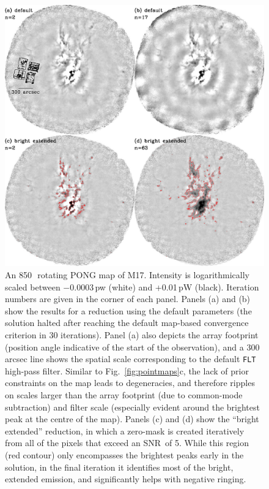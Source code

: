 \documentclass[useAMS,usenatbib,nofootinbib]{mn2e}
\newcommand{\snr}{SNR}
\newcommand{\model}[1]{\texttt{#1}}
\begin{document}
\begin{figure}
\centering
\includegraphics[width=\linewidth]{m17.pdf}
\caption{An 850\,\micron\ rotating PONG map of M17. Intensity is
logarithmically scaled between $-$0.0003\,pw (white) and +0.01\,pW
(black). Iteration numbers are given in the corner of each
panel. Panels (a) and (b) show the results for a reduction using the
default parameters (the solution halted after reaching the default
map-based convergence criterion in 30 iterations). Panel (a) also
depicts the array footprint (position angle indicative of the start of
the observation), and a 300\,arcsec line shows the spatial scale
corresponding to the default \model{FLT} high-pass filter. Similar to
Fig.~\ref{fig:pointmaps}c, the lack of prior constraints on the map
leads to degeneracies, and therefore ripples on scales larger than the
array footprint (due to common-mode subtraction) and filter scale
(especially evident around the brightest peak at the centre of the
map). Panels (c) and (d) show the ``bright extended'' reduction, in
which a zero-mask is created iteratively from all of the pixels that
exceed an \snr\ of 5. While this region (red contour) only encompasses
the brightest peaks early in the solution, in the final iteration it
identifies most of the bright, extended emission, and significantly
helps with negative ringing.}
\label{fig:m17}
\end{figure}
\end{document}
